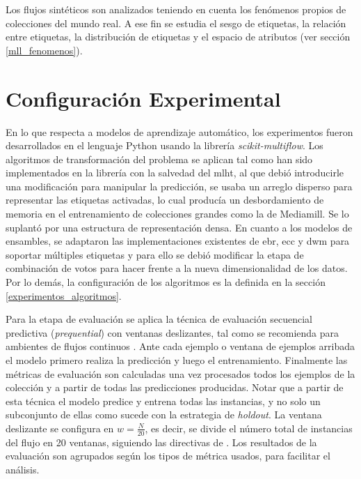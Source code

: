 Los flujos sintéticos son analizados teniendo en cuenta los fenómenos propios de
colecciones del mundo real. A ese fin se estudia el sesgo de etiquetas, la
relación entre etiquetas, la distribución de etiquetas y el espacio de atributos
(ver sección \ref{mll_fenomenos}). 

\section{Configuración Experimental}

En lo que respecta a modelos de aprendizaje automático, los experimentos fueron
desarrollados en el lenguaje Python usando la librería
\textit{scikit-multiflow}. Los algoritmos de transformación del problema se
aplican tal como han sido implementados en la librería con la salvedad del
\acrshort{mlht}, al que debió introducirle una modificación para manipular la
predicción, se usaba un arreglo disperso para representar las etiquetas
activadas, lo cual producía un desbordamiento de memoria en el entrenamiento de
colecciones grandes como la de Mediamill. Se lo suplantó por una estructura de
representación densa. En cuanto a los modelos de ensambles, se adaptaron las
implementaciones existentes de \acrshort{ebr}, \acrshort{ecc} y \acrshort{dwm}
para soportar múltiples etiquetas y para ello se debió modificar la etapa de
combinación de votos para hacer frente a la nueva dimensionalidad de los datos.
Por lo demás, la configuración de los algoritmos es la definida en la sección
\ref{experimentos_algoritmos}.

Para la etapa de evaluación se aplica la técnica de evaluación secuencial
predictiva (\textit{prequential}) con ventanas deslizantes, tal como se
recomienda para ambientes de flujos continuos \cite{gama_evaluating_2013}. Ante
cada ejemplo o ventana de ejemplos arribada el modelo primero realiza la
predicción y luego el entrenamiento. Finalmente las métricas de evaluación son
calculadas una vez procesados todos los ejemplos de la colección y a partir de
todas las predicciones producidas.  Notar que a partir de esta técnica el modelo
predice y entrena todas las instancias, y no solo un subconjunto de ellas como
sucede con la estrategia de \textit{holdout}. La ventana deslizante se configura
en $w = \frac{N}{20}$, es decir, se divide el número total de instancias del
flujo en 20 ventanas, siguiendo las directivas de \textcite{read_scalable_2012}.
Los resultados de la evaluación son agrupados según los tipos de métrica usados,
para facilitar el análisis.

